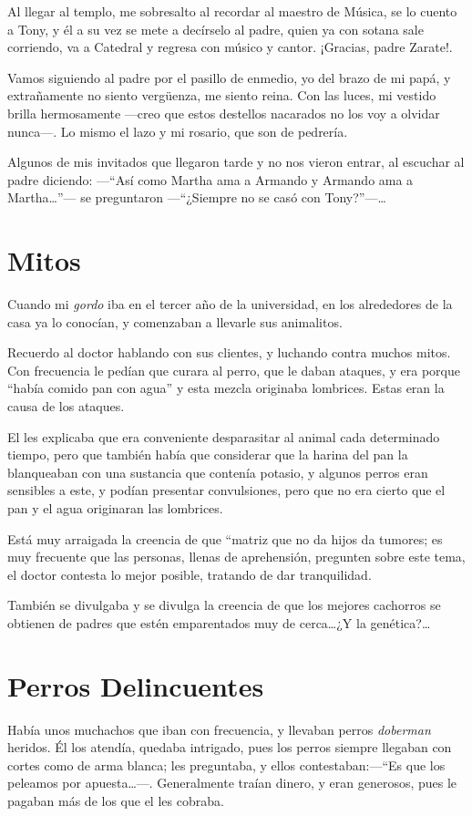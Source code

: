 \documentclass[letterpaper, 12pt]{book}
\begin{document}
Al llegar al templo, me sobresalto al recordar al maestro de Música, se lo cuento a Tony, y él a su vez se mete a decírselo al padre, quien ya con sotana sale corriendo, va a Catedral y regresa con músico y cantor. ¡Gracias, padre Zarate!.

Vamos siguiendo al padre por el pasillo de enmedio, yo del brazo de mi papá, y extrañamente no siento vergüenza, me siento reina. Con las luces, mi vestido brilla hermosamente ---creo que estos destellos nacarados no los voy a olvidar nunca---. Lo mismo el lazo y mi rosario, que son de pedrería.

Algunos de mis invitados que llegaron tarde y no nos vieron entrar, al escuchar al padre diciendo: ---``Así como Martha ama a Armando y Armando ama a Martha\ldots''--- se preguntaron ---``¿Siempre no se casó con Tony?''---\ldots

\chapter{Mitos}
Cuando mi \textit{gordo} iba en el tercer año de la universidad, en los alrededores de la casa ya lo conocían, y comenzaban a llevarle sus animalitos.

Recuerdo al doctor hablando con sus clientes, y luchando contra muchos mitos. Con frecuencia le pedían que curara al perro, que le daban ataques, y era porque ``había comido pan con agua'' y esta mezcla originaba lombrices. Estas eran la causa de los ataques.

El les explicaba que era conveniente desparasitar al animal cada determinado tiempo, pero que también había que considerar que la harina del pan la blanqueaban con una sustancia que contenía potasio, y algunos perros eran sensibles a este, y podían presentar convulsiones, pero que no era cierto que el pan y el agua originaran las lombrices.

Está muy arraigada la creencia de que ``matriz que no da hijos da tumores; es muy frecuente que las personas, llenas de aprehensión, pregunten sobre este tema, el doctor contesta lo mejor posible, tratando de dar tranquilidad. 

También se divulgaba y se divulga la creencia de que los mejores cachorros se obtienen de padres que estén emparentados muy de cerca\ldots¿Y la genética?\ldots

\chapter{Perros Delincuentes}
Había unos muchachos que iban con frecuencia, y llevaban perros \textit{doberman} heridos. Él los atendía, quedaba intrigado, pues los perros siempre llegaban con cortes como de arma blanca; les preguntaba, y ellos contestaban:---``Es que los peleamos por apuesta\ldots---. Generalmente traían dinero, y eran generosos, pues le pagaban más de los que el les cobraba.
\end{document}
